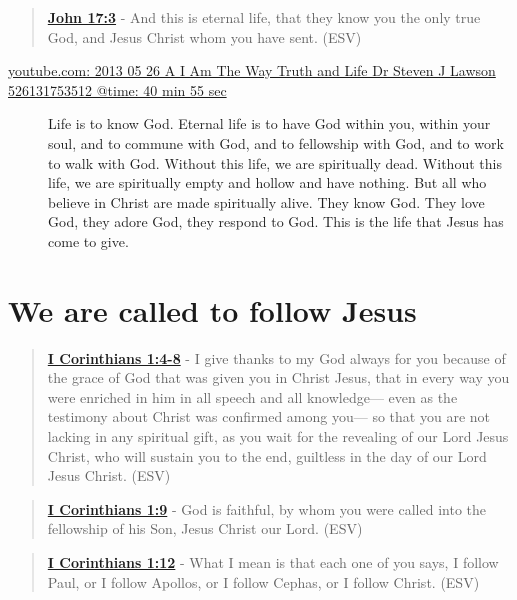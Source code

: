 \documentclass[11pt]{article}
\begin{document}
\begin{quote}
\textbf{\href{https://www.biblegateway.com/passage/?search=John\%2017\%3A3\&version=ESV}{John 17:3}} - And this is eternal life, that they know you the only true God, and Jesus Christ whom you have sent. (ESV)
\end{quote}

\begin{description}
\item[{\href{https://youtube.com/watch?v=-33jh183A1s\&t=2455}{youtube.com: 2013 05 26 A I Am The Way  Truth and Life   Dr  Steven J  Lawson   526131753512 @time: 40 min 55 sec}}] Life is to know God. Eternal life is to
have God within you, within your soul, and
to commune with God, and to fellowship with
God, and to work to walk with God. Without
this life, we are spiritually dead.
Without this life, we are spiritually
empty and hollow and have nothing.
But all who believe in Christ are made
spiritually alive. They know God.
They love God, they adore God, they respond to
God. This is the life that Jesus has come
to give.
\end{description}

\section{We are called to follow Jesus}
\label{sec:org6e20f8e}
\begin{quote}
\textbf{\href{https://www.biblegateway.com/passage/?search=1\%20Corinthians\%201\%3A4-8\&version=ESV}{I Corinthians 1:4-8}} - I give thanks to my God always for you because of the grace of God that was given you in Christ Jesus, that in every way you were enriched in him in all speech and all knowledge— even as the testimony about Christ was confirmed among you— so that you are not lacking in any spiritual gift, as you wait for the revealing of our Lord Jesus Christ, who will sustain you to the end, guiltless in the day of our Lord Jesus Christ. (ESV)
\end{quote}

\begin{quote}
\textbf{\href{https://www.biblegateway.com/passage/?search=1\%20Corinthians\%201\%3A9\&version=ESV}{I Corinthians 1:9}} - God is faithful, by whom you were called into the fellowship of his Son, Jesus Christ our Lord. (ESV)
\end{quote}

\begin{quote}
\textbf{\href{https://www.biblegateway.com/passage/?search=1\%20Corinthians\%201\%3A12\&version=ESV}{I Corinthians 1:12}} - What I mean is that each one of you says, I follow Paul, or I follow Apollos, or I follow Cephas, or I follow Christ. (ESV)
\end{quote}
\end{document}
